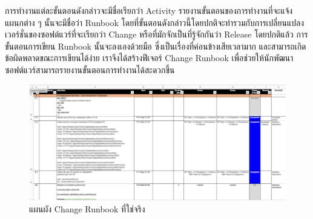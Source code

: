 การทำงานแต่ละขั้นตอนดังกล่าวจะมีชื่อเรียกว่า Activity รายงานขั้นตอนของการทำงานที่จะแจ้งแผนกต่าง ๆ นั้นจะมีชื่อว่า Runbook โดยที่ขั้นตอนดังกล่าวนี้โดยปกติจะทำรวมกับการเปลี่ยนแปลงเวอร์ชั่นของซอฟต์แวร์ที่จะเรียกว่า Change หรือที่มักจักเป็นที่รู้จักกันว่า Release โดยปกติแล้ว การขั้นตอนการเขียน Runbook นั้นจะลงเองด้วยมือ ซึ่งเป็นเรื่องที่ค่อนข้างเสียเวลามาก และสามารถเกิดข้อผิดพลาดขณะการเขียนได้ง่าย เราจึงได้สร้างฟีเจอร์ Change Runbook เพื่อช่วยให้นักพัฒนาซอฟต์แวร์สามารถรายงานขั้นตอนการทำงานได้สะดวกขึ้น

\begin{figure}[H]
    \begin{center}
        \includegraphics[scale=0.325]{resources/change-runbook-example-blurred.png}
    \end{center}
    \caption[แผนผัง Change Runbook ที่ใช่จริง]{แผนผัง Change Runbook ที่ใช่จริง}
    \label{fig:keycloak-er}
\end{figure}

